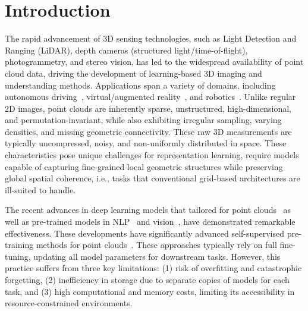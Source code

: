 \section{Introduction}
\label{sec:intro}


The rapid advancement of 3D sensing technologies, such as Light Detection and Ranging (LiDAR), depth cameras (structured light/time-of-flight), photogrammetry, and stereo vision, has led to the widespread availability of point cloud data, driving the development of learning-based 3D imaging and understanding methods. Applications span a variety of domains, including autonomous driving~\cite{yang2024visual,song2024graphbev,chen20203d}, virtual/augmented reality~\cite{casado2023rendering,garrido2021point}, and robotics~\cite{wang2021trajectory,chen2022direct,christen2023learning}. 
Unlike regular 2D images, point clouds are inherently sparse, unstructured, high-dimensional, and permutation-invariant, while also exhibiting irregular sampling, varying densities, and missing geometric connectivity. These raw 3D measurements are typically uncompressed, noisy, and non-uniformly distributed in space. These characteristics pose unique challenges for representation learning, require models capable of capturing fine-grained local geometric structures while preserving global spatial coherence, i.e., tasks that conventional grid-based architectures are ill-suited to handle.

The recent advances in deep learning models that tailored for point clouds~\cite{qi2017pointnet, qi2017pointnet++, li2018pointcnn, qian2022pointnext, wang2019dynamic, wu2024point} as well as pre-trained models in NLP~\cite{devlin2018bert, brown2020language} and vision~\cite{he2020momentum, chen2020improved}, have demonstrated remarkable effectiveness. These developments have significantly advanced self-supervised pre-training methods for point clouds~\cite{pang2022masked, yu2022point, zhang2022point, afham2022crosspoint}.
These approaches typically rely on full fine-tuning, updating all model parameters for downstream tasks. However, this practice suffers from three key limitations: (1) risk of overfitting and catastrophic forgetting, (2) inefficiency in storage due to separate copies of models for each task, and (3) high computational and memory costs, limiting its accessibility in resource-constrained environments.


